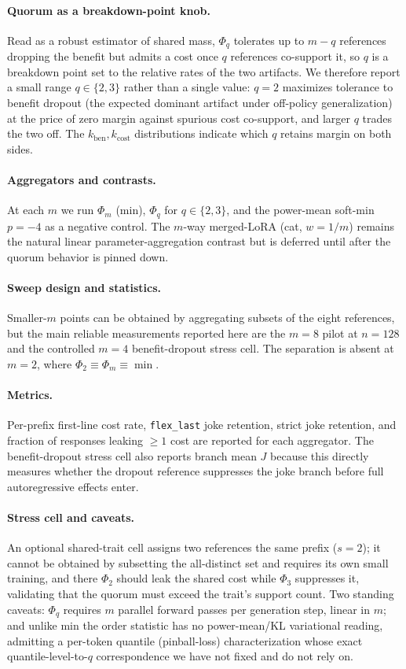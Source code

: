 \documentclass[11pt]{article}
\begin{document}
\paragraph{Quorum as a breakdown-point knob.} Read as a robust estimator of shared mass, $\Phi_q$ tolerates up to $m - q$ references dropping the benefit but admits a cost once $q$ references co-support it, so $q$ is a breakdown point set to the relative rates of the two artifacts. We therefore report a small range $q \in \{2, 3\}$ rather than a single value: $q = 2$ maximizes tolerance to benefit dropout (the expected dominant artifact under off-policy generalization) at the price of zero margin against spurious cost co-support, and larger $q$ trades the two off. The $k_{\mathrm{ben}}, k_{\mathrm{cost}}$ distributions indicate which $q$ retains margin on both sides.

\paragraph{Aggregators and contrasts.} At each $m$ we run $\Phi_m$ (min), $\Phi_q$ for $q \in \{2, 3\}$, and the power-mean soft-min $p = -4$ as a negative control. The $m$-way merged-LoRA (cat, $w = 1/m$) remains the natural linear parameter-aggregation contrast but is deferred until after the quorum behavior is pinned down.

\paragraph{Sweep design and statistics.} Smaller-$m$ points can be obtained by aggregating subsets of the eight references, but the main reliable measurements reported here are the $m=8$ pilot at $n=128$ and the controlled $m=4$ benefit-dropout stress cell. The separation is absent at $m = 2$, where $\Phi_2 \equiv \Phi_m \equiv \min$.

\paragraph{Metrics.} Per-prefix first-line cost rate, \texttt{flex\_last} joke retention, strict joke retention, and fraction of responses leaking $\ge 1$ cost are reported for each aggregator. The benefit-dropout stress cell also reports branch mean $J$ because this directly measures whether the dropout reference suppresses the joke branch before full autoregressive effects enter.

\paragraph{Stress cell and caveats.} An optional shared-trait cell assigns two references the same prefix ($s = 2$); it cannot be obtained by subsetting the all-distinct set and requires its own small training, and there $\Phi_2$ should leak the shared cost while $\Phi_3$ suppresses it, validating that the quorum must exceed the trait's support count. Two standing caveats: $\Phi_q$ requires $m$ parallel forward passes per generation step, linear in $m$; and unlike min the order statistic has no power-mean/KL variational reading, admitting a per-token quantile (pinball-loss) characterization whose exact quantile-level-to-$q$ correspondence we have not fixed and do not rely on.
\end{document}
